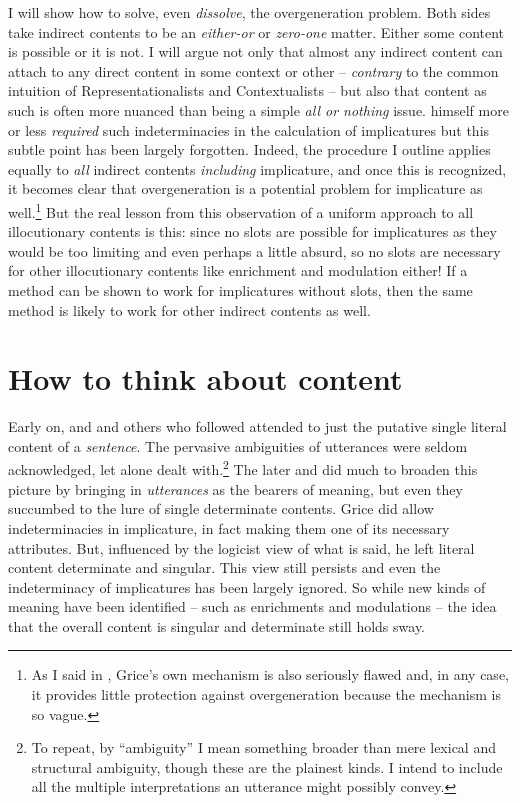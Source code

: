 I will show how to solve, even \emph{dissolve}, the overgeneration problem. Both sides take indirect contents to be an \emph{either-or} or \emph{zero-one} matter. Either some content is possible or it is not. I will argue not only that almost any indirect content can attach to any direct content in some context or other -- \emph{contrary} to the common intuition of Representationalists and Contextualists -- but also that content as such is often more nuanced than being a simple \emph{all or nothing} issue. \citet[39--40]{grice:lc, grice:landc} himself more or less \emph{required} such indeterminacies in the calculation of implicatures but this subtle point has been largely forgotten. Indeed, the procedure I outline applies equally to \emph{all} indirect contents \emph{including} implicature, and once this is recognized, it becomes clear that overgeneration is a potential problem for implicature as well.\footnote{As I said in , Grice's own mechanism is also seriously flawed and, in any case, it provides little protection against overgeneration because the mechanism is so vague.} But the real lesson from this observation of a uniform approach to all illocutionary contents is this: since no slots are possible for implicatures as they would be too limiting and even perhaps a little absurd, so no slots are necessary for other illocutionary contents like enrichment and modulation either! If a method can be shown to work for implicatures without slots, then the same method is likely to work for other indirect contents as well. 



\section{How to think about content}\label{page:content} \label{sec:how to think about content}

Early on, \citet{frege:sr} and \citet{russell:d} and others who followed attended to just the putative single literal content of a \emph{sentence}. The pervasive ambiguities of utterances were seldom acknowledged, let alone dealt with.\footnote{To repeat, by ``ambiguity'' I mean something broader than mere lexical and structural ambiguity, though these are the plainest kinds. I intend to include all the multiple interpretations an utterance might possibly convey.} The later \citet{wittgenstein:pi} and \citet{austin:pp} did much to broaden this picture by bringing in \emph{utterances} as the bearers of meaning, but even they succumbed to the lure of single determinate contents. Grice did allow indeterminacies in implicature, in fact making them one of its necessary attributes. But, influenced by the logicist view of what is said, he left literal content determinate and singular. This view still persists and even the indeterminacy of implicatures has been largely ignored. So while new kinds of meaning have been identified -- such as enrichments and modulations -- the idea that the overall content is singular and determinate still holds sway.

